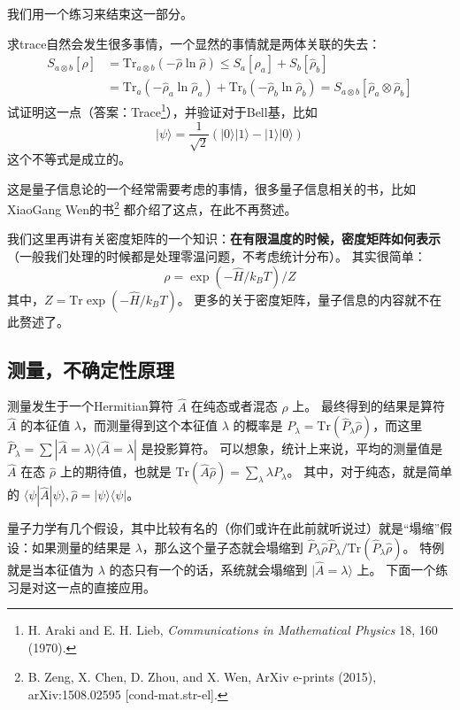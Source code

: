 我们用一个练习来结束这一部分。
\begin{exercise}{}
求trace自然会发生很多事情，一个显然的事情就是两体关联的失去：
\begin{equation}
\begin{split}
S_{a\otimes b}[\hat\rho]&=\text{Tr}_{a\otimes b}(-\hat\rho\ln\hat\rho)\le S_a[\hat\rho_a]+S_b[\hat\rho_b]\\
&=\text{Tr}_a(-\hat\rho_a\ln\hat\rho_a)+\text{Tr}_b(-\hat\rho_b\ln\hat\rho_b)=S_{a\otimes b}[\hat\rho_a\otimes\hat\rho_b]
\end{split}
\end{equation}
试证明这一点（答案：Trace\footnote{H. Araki and E. H. Lieb, \textsl{Communications in Mathematical Physics} 18, 160 (1970).}），并验证对于Bell基，比如
\begin{equation}
|\psi\rangle = \frac{1}{\sqrt{2}}(|0\rangle|1\rangle-|1\rangle|0\rangle)
\end{equation}
这个不等式是成立的。

这是量子信息论的一个经常需要考虑的事情，很多量子信息相关的书，比如XiaoGang Wen的书\footnote{B. Zeng, X. Chen, D. Zhou, and X. Wen, ArXiv e-prints (2015), arXiv:1508.02595 [cond-mat.str-el].} 都介绍了这点，在此不再赘述。
\end{exercise}

我们这里再讲有关密度矩阵的一个知识：\textbf{在有限温度的时候，密度矩阵如何表示}（一般我们处理的时候都是处理零温问题，不考虑统计分布）。 其实很简单：
\begin{equation}
\rho=\exp(-\hat{H}/k_BT)/Z
\end{equation}
其中，$Z=\text{Tr}\exp(-\hat{H}/k_BT)$。 更多的关于密度矩阵，量子信息的内容就不在此赘述了。


\subsection{测量，不确定性原理}

测量发生于一个Hermitian算符 $\hat A$ 在纯态或者混态 $\hat\rho$ 上。 最终得到的结果是算符 $\hat A$ 的本征值 $\lambda$，而测量得到这个本征值 $\lambda$ 的概率是 $P_\lambda=\text{Tr}(\hat{P}_\lambda\hat\rho)$，而这里 $\hat P_\lambda=\sum|\hat{A}=\lambda\rangle\langle\hat{A}=\lambda|$ 是投影算符。 可以想象，统计上来说，平均的测量值是 $\hat A$ 在态 $\hat\rho$ 上的期待值，也就是 $\text{Tr}(\hat A\hat\rho)=\sum_\lambda \lambda P_\lambda$。 其中，对于纯态，就是简单的 $\langle\psi|\hat A|\psi\rangle, \hat\rho=|\psi\rangle\langle\psi|$。

量子力学有几个假设，其中比较有名的（你们或许在此前就听说过）就是``塌缩''假设：如果测量的结果是 $\lambda$，那么这个量子态就会塌缩到 ${\hat P_\lambda\hat\rho\hat P_\lambda}/{\text{Tr}(\hat P_\lambda\hat\rho)}$。 特例就是当本征值为 $\lambda$ 的态只有一个的话，系统就会塌缩到 $|\hat{A}=\lambda\rangle$ 上。 下面一个练习是对这一点的直接应用。

